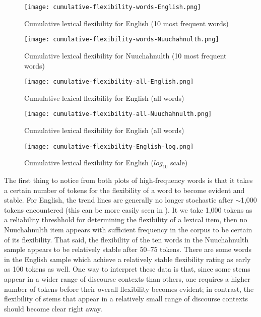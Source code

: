\begin{figure}[h!]
  \centering
  \caption{Cumulative lexical flexibility for English (10 most frequent words)}
  \label{fig:cumulative-flexibility-words-English}
  \texttt{[image: cumulative-flexibility-words-English.png]}
\end{figure}

\begin{figure}[h!]
  \centering
  \caption{Cumulative lexical flexibility for Nuuchahnulth (10 most frequent words)}
  \label{fig:cumulative-flexibility-words-Nuuchahnulth}
  \texttt{[image: cumulative-flexibility-words-Nuuchahnulth.png]}
\end{figure}

\begin{figure}[h!]
  \centering
  \caption{Cumulative lexical flexibility for English (all words)}
  \label{fig:cumulative-flexibility-all-English}
  \texttt{[image: cumulative-flexibility-all-English.png]}
\end{figure}

\begin{figure}[h!]
  \centering
  \caption{Cumulative lexical flexibility for English (all words)}
  \label{fig:cumulative-flexibility-all-Nuuchahnulth}
  \texttt{[image: cumulative-flexibility-all-Nuuchahnulth.png]}
\end{figure}

\begin{figure}[h!]
  \centering
  \caption{Cumulative lexical flexibility for English ($log_10$ scale)}
  \label{fig:cumulative-flexibility-English-log}
  \texttt{[image: cumulative-flexibility-English-log.png]}
\end{figure}

The first thing to notice from both plots of high-frequency words is that it takes a certain number of tokens for the flexibility of a word to become evident and stable. For English, the trend lines are generally no longer stochastic after $\sim$1,000 tokens encountered (this can be more easily seen in ). It we take 1,000 tokens as a reliability threshhold for determining the flexibility of a lexical item, then no Nuuchahnulth item appears with sufficient frequency in the corpus to be certain of its flexibility. That said, the flexibility of the ten words in the Nuuchahnulth sample appears to be relatively stable after 50–75 tokens. There are some words in the English sample which achieve a relatively stable flexibility rating as early as 100 tokens as well. One way to interpret these data is that, since some stems appear in a wider range of discourse contexts than others, one requires a higher number of tokens before their overall flexibility becomes evident; in contrast, the flexibility of stems that appear in a relatively small range of discourse contexts should become clear right away.


